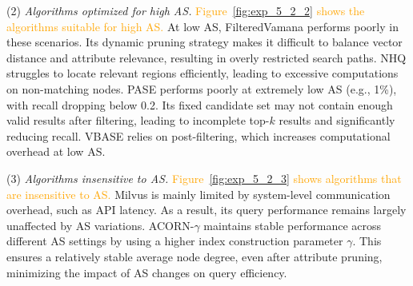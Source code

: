 \documentclass[sigconf, nonacm]{acmart}
\begin{document}
{	\par
	(2) \textit{Algorithms optimized for high AS.}  
	\textcolor{orange}{Figure~\ref{fig:exp_5_2_2} shows the algorithms suitable for high AS.}
	At low AS, FilteredVamana performs poorly in these scenarios. Its dynamic pruning strategy makes it difficult to balance vector distance and attribute relevance, resulting in overly restricted search paths. NHQ struggles to locate relevant regions efficiently, leading to excessive computations on non-matching nodes. 
	 PASE performs poorly at extremely low AS (e.g., 1\%), with recall dropping below 0.2. Its fixed candidate set may not contain enough valid results after filtering, leading to incomplete top-$k$ results and significantly reducing recall. VBASE relies on post-filtering, which increases computational overhead at low AS.
	
	\par
	(3) \textit{Algorithms insensitive to AS.}  
	\textcolor{orange}{Figure~\ref{fig:exp_5_2_3} shows algorithms that are insensitive to AS.}
	Milvus is mainly limited by system-level communication overhead, such as API latency. As a result, its query performance remains largely unaffected by AS variations. ACORN-\(\gamma\) maintains stable performance across different AS settings by using a higher index construction parameter $\gamma$. This ensures a relatively stable average node degree, even after attribute pruning, minimizing the impact of AS changes on query efficiency.
	
	
	
		
}
\end{document}
